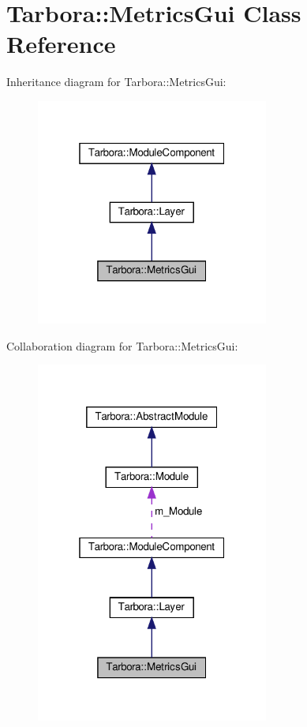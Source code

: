 \hypertarget{classTarbora_1_1MetricsGui}{}\section{Tarbora\+:\+:Metrics\+Gui Class Reference}
\label{classTarbora_1_1MetricsGui}


Inheritance diagram for Tarbora\+:\+:Metrics\+Gui\+:
\nopagebreak
\begin{figure}[H]
\begin{center}
\leavevmode
\includegraphics[width=217pt]{classTarbora_1_1MetricsGui__inherit__graph}
\end{center}
\end{figure}


Collaboration diagram for Tarbora\+:\+:Metrics\+Gui\+:
\nopagebreak
\begin{figure}[H]
\begin{center}
\leavevmode
\includegraphics[width=217pt]{classTarbora_1_1MetricsGui__coll__graph}
\end{center}
\end{figure}
